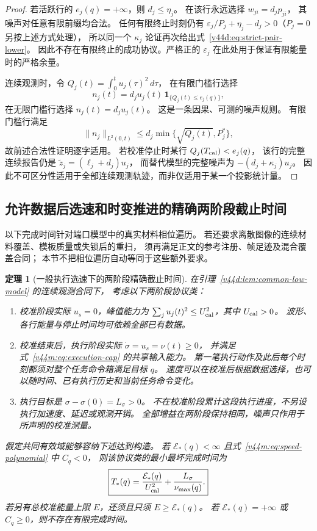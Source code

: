 \documentclass[11pt,a4paper]{article}
\numberwithin{equation}{section}
\newtheorem{theorem}{定理}[section]
\theoremstyle{definition}
\begin{document}
\begin{proof}
若活跃行的 $e_j(q)=+\infty$，则 $d_j\le\eta_j$。
在该行永远选择 $w_{ji}=d_jp_{ji}$，
其噪声对任意有限前缀均合法。
任何有限终止时刻仍有
$\varepsilon_j/P_j+\eta_j-d_j>0$（$P_j=0$ 另按上述方式处理），
所以同一个 $\kappa_j$ 论证再次给出式~\eqref{v44d:eq:strict-pair-lower}。
因此不存在有限终止的成功协议。严格正的 $\varepsilon_j$ 在此处用于保证有限能量时的严格余量。

连续观测时，令
$Q_j(t)=\int_0^t u_j(\tau)^2\,d\tau$，
在有限门槛行选择
\begin{equation}
 n_j(t)=d_ju_j(t)\,
       \mathbf 1_{\{Q_j(t)\le e_j(q)\}},
 \label{v44d:eq:continuous-threshold-adversary}
\end{equation}
在无限门槛行选择 $n_j(t)=d_ju_j(t)$。
这是一条因果、可测的噪声规则。
有限门槛行满足
\[
 \|n_j\|_{L^2(0,t)}
 \le d_j\min\{\sqrt{Q_j(t)},P_j^*\},
\]
故前述合法性证明逐字适用。
若校准停止时某行 $Q_j(T_{\rm cal})<e_j(q)$，
该行的完整连续报告仍是
$\widetilde z_j=(\ell_j+d_j)u_j$，
而替代模型的完整噪声为 $-(d_j+\kappa_j)u_j$。
因此不可区分性适用于全部连续观测轨迹，而非仅适用于某一个投影统计量。
\end{proof}

\subsection{允许数据后选速和时变推进的精确两阶段截止时间}

以下完成时间针对端口模型中的真实材料相位遍历。
若还要求离散图像的连续材料覆盖、模板质量或失锁后的重扫，
须再满足正文的参考注册、帧足迹及混合覆盖合同；
本节不把相位遍历自动等同于这些额外要求。

\begin{theorem}[一般执行选速下的两阶段精确截止时间]
\label{v44d:thm:adaptive-speed-deadline}
在引理~\ref{v44d:lem:common-low-model} 的连续观测合同下，
考虑以下两阶段协议类：
\begin{enumerate}
 \item 校准阶段实际 $u_s=0$，峰值能力为
 $\sum_j u_j(t)^2\le U_{\rm cal}^2$，其中 $U_{\rm cal}>0$。
 波形、各行能量与停止时间均可依赖全部已有数据。
 \item 校准结束后，执行阶段实际 $\dot\sigma=u_s=\nu(t)\ge0$，
 并满足式~\eqref{v44m:eq:execution-cap} 的共享输入能力。
 第一笔执行动作及此后每个时刻都须对整个任务命令箱满足目标 $q$。
 速度可以在校准后根据数据选择，也可以随时间、已有执行历史和当前任务命令变化。
 \item 执行目标是 $\sigma-\sigma(0)=L_\sigma>0$。
 不在校准阶段累计这段执行进度，不另设执行加速度、延迟或观测开销。
 全部增益在两阶段保持相同，噪声只作用于所声明的校准测量。
\end{enumerate}
假定共同有效域能够容纳下述达到构造。
若 $\mathcal E_*(q)<\infty$ 且式~\eqref{v44m:eq:speed-polynomial} 中 $C_q<0$，
则该协议类的最小最坏完成时间为
\begin{equation}
 \boxed{
 T_*(q)=\frac{\mathcal E_*(q)}{U_{\rm cal}^2}
        +\frac{L_\sigma}{\nu_{\max}(q)}.}
 \label{v44d:eq:adaptive-speed-deadline}
\end{equation}
若另有总校准能量上限 $E$，还须且只须 $E\ge\mathcal E_*(q)$。
若 $\mathcal E_*(q)=+\infty$ 或 $C_q\ge0$，则不存在有限完成时间。
\end{theorem}
\end{document}
